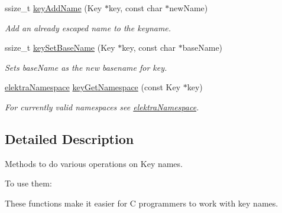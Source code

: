 \begin{DoxyCompactItemize}
ssize\+\_\+t \mbox{\hyperlink{group__keyname_gaa70593a2c772c4b7bc33423b9b10a270}{key\+Add\+Name}} (Key $\ast$key, const char $\ast$new\+Name)
\begin{DoxyCompactList}\small\item\em Add an already escaped name to the keyname. \end{DoxyCompactList}\item 
ssize\+\_\+t \mbox{\hyperlink{group__keyname_ga6e804bd453f98c28b0ff51430d1df407}{key\+Set\+Base\+Name}} (Key $\ast$key, const char $\ast$base\+Name)
\begin{DoxyCompactList}\small\item\em Sets {\ttfamily base\+Name} as the new basename for {\ttfamily key}. \end{DoxyCompactList}\item 
\mbox{\hyperlink{group__key_gaec3b8d6f430ae49b91bafe8a86310a68}{elektra\+Namespace}} \mbox{\hyperlink{group__keyname_gafc3ca03ed10f87eb59bdc02cf2a0de8d}{key\+Get\+Namespace}} (const Key $\ast$key)
\begin{DoxyCompactList}\small\item\em For currently valid namespaces see \mbox{\hyperlink{group__key_gaec3b8d6f430ae49b91bafe8a86310a68}{elektra\+Namespace}}. \end{DoxyCompactList}\end{DoxyCompactItemize}


\subsection{Detailed Description}
Methods to do various operations on Key names. 

To use them\+: 
\begin{DoxyCode}{0}
\DoxyCodeLine{\textcolor{preprocessor}{\#include <kdb.h>}}
\end{DoxyCode}


These functions make it easier for C programmers to work with key names.

